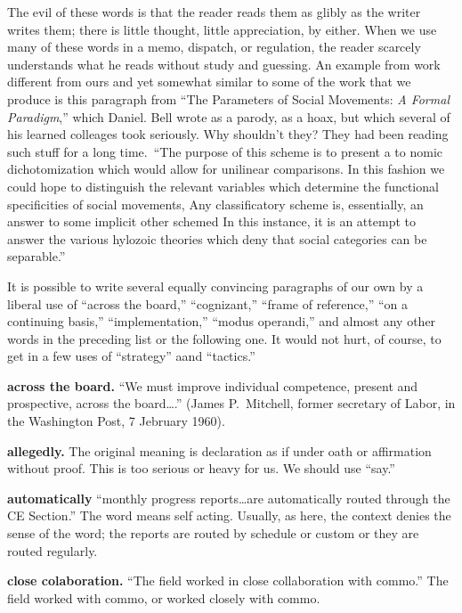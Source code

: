 \documentclass[
    oneside,
    11pt,
]{memoir}
\begin{document}
The evil of these words is that the reader reads them as glibly as the writer writes them; there is little thought, little appreciation, by either. When we use many of these words in a memo, dispatch, or regulation, the reader scarcely understands what he reads without study and guessing. An example from work different from ours and yet somewhat similar to some of the work that we produce is this paragraph from \enquote{The Parameters of Social Movements: \emph{A Formal Paradigm},} which Daniel. Bell wrote as a parody, as a hoax, but which several of his learned colleages took seriously. Why shouldn't they? They had been reading such stuff for a long time.\ \enquote{The purpose of this scheme is to present a to nomic dichotomization which would allow for unilinear comparisons. In this fashion we could hope to distinguish the relevant variables which determine the functional specificities of social movements, Any classificatory scheme is, essentially, an answer to some implicit other schemed In this instance, it is an attempt to answer the various hylozoic theories which deny that social categories can be separable.}

It is possible to write several equally convincing paragraphs of our own by a liberal use of \enquote{across the board,} \enquote{cognizant,} \enquote{frame of reference,} \enquote{on a continuing basis,} \enquote{implementation,} \enquote{modus operandi,} and almost any other words in the preceding list or the following one. It would not hurt, of course, to get in a few uses of \enquote{strategy} aand \enquote{tactics.}

\textbf{across the board.} \enquote{We must improve individual competence, present and prospective, across the board\dots.} (James P.\ Mitchell, former secretary of Labor, in the Washington Post, 7 Jebruary 1960).

\textbf{allegedly.} The original meaning is declaration as if under oath or affirmation without proof. This is too serious or heavy for us. We should use \enquote{say.}

\textbf{automatically} \enquote{monthly progress reports\dots are automatically routed through the CE Section.} The word means self acting. Usually, as here, the context denies the sense of the word; the reports are routed by schedule or custom or they are routed regularly.

\textbf{close colaboration.} \enquote{The field worked in close collaboration with commo.} The field worked with commo, or worked closely with commo.
\end{document}
